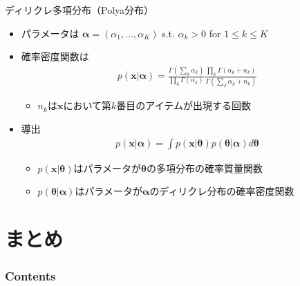 \documentclass[aspectratio=169,unicode,dvipdfmx,14pt]{beamer}
\begin{document}
\begin{frame}{ディリクレ多項分布（Polya分布）}
\begin{itemize}
\item パラメータは
$\bm{\alpha} = (\alpha_1, \ldots, \alpha_K)$ s.t. $\alpha_k > 0$ for $1 \leq k \leq K$
\item 確率密度関数は
\begin{align}
p(\bm{x} | \bm{\alpha}) = \frac{\Gamma(\sum_k \alpha_k)}{\prod_k \Gamma(\alpha_k)}
\frac{\prod_k \Gamma(\alpha_k + n_k)}{\Gamma(\sum_k \alpha_k + n_k)}
\end{align}
\vspace{-.1in}
\begin{itemize}
\item $n_k$は$\bm{x}$において第$k$番目のアイテムが出現する回数
\end{itemize}
\item 導出
\begin{align}
p(\bm{x} | \bm{\alpha}) = \int p(\bm{x}|\bm{\theta}) p(\bm{\theta} | \bm{\alpha}) d\bm{\theta}
\end{align}
\vspace{-.2in}
\begin{itemize}
\item $p(\bm{x}|\bm{\theta})$はパラメータが$\bm{\theta}$の多項分布の確率質量関数
\item $p(\bm{\theta} | \bm{\alpha})$はパラメータが$\bm{\alpha}$のディリクレ分布の確率密度関数
\end{itemize}
\end{itemize}
\end{frame}

\section{まとめ}

\begin{frame}\frametitle{Contents}
\Large \tableofcontents[currentsection]
\end{frame}
\end{document}
